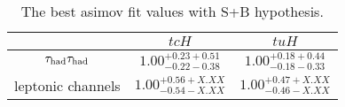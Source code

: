 \begin{table}[htb]
\caption{ The best asimov fit values with S+B hypothesis. }
\centering
\begin{tabular}{|c|c|c|} \hline
  & $tcH$ & $tuH$ \\ \hline
  $\tau_\text{had}{}\tau_\text{had}$ & $1.00^{+0.23 +0.51}_{-0.22 -0.38}$ & $1.00^{+0.18 +0.44}_{-0.18 -0.33}$ \\ \hline
  leptonic channels & $1.00^{+0.56 +X.XX}_{-0.54 -X.XX}$ & $1.00^{+0.47 +X.XX}_{-0.46 -X.XX}$ \\ \hline

\end{tabular}
\label{tab:tab_limit}
\end{table}


%


